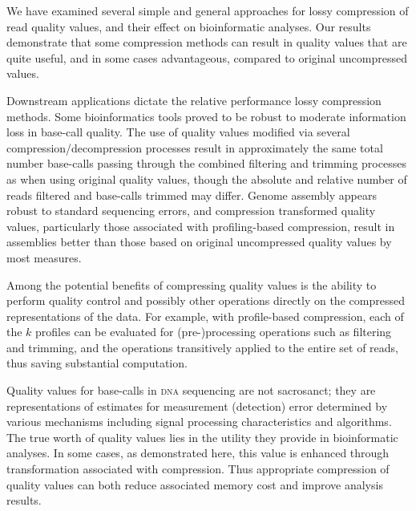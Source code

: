\documentclass{bioinfo}
\begin{document}
We have examined several simple and general approaches for lossy
compression of read quality values, and their effect on bioinformatic
analyses. Our results demonstrate that some compression methods can
result in quality values that are quite useful, and in some cases
advantageous, compared to original uncompressed values.

Downstream applications dictate the relative performance lossy
compression methods.  Some bioinformatics tools proved to be robust to
moderate information loss in base-call quality. The use of quality
values modified via several compression/decompression processes result
in approximately the same total number base-calls passing through the
combined filtering and trimming processes as when using original
quality values, though the absolute and relative number of reads
filtered and base-calls trimmed may differ. Genome assembly appears
robust to standard sequencing errors, and compression transformed
quality values, particularly those associated with profiling-based
compression, result in assemblies better than those based on original
uncompressed quality values by most measures.

Among the potential benefits of compressing quality values is the
ability to perform quality control and possibly other operations
directly on the compressed representations of the data. For example,
with profile-based compression, each of the $k$ profiles can be
evaluated for (pre-)processing operations such as filtering and
trimming, and the operations transitively applied to the entire set of
reads, thus saving substantial computation.

%
%

Quality values for base-calls in \textsc{dna} sequencing are not
sacrosanct; they are representations of estimates for measurement
(detection) error determined by various mechanisms including signal
processing characteristics and algorithms. The true worth of quality
values lies in the utility they provide in bioinformatic analyses. In
some cases, as demonstrated here, this value is enhanced through
transformation associated with compression. Thus appropriate
compression of quality values can both reduce associated memory cost
and improve analysis results.
\end{document}
